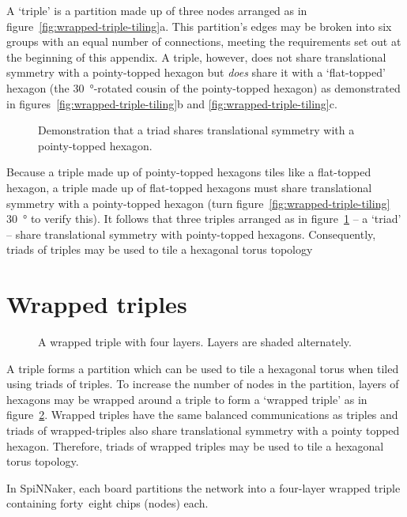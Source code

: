 		A `triple' is a partition made up of three nodes arranged as in
		figure~\ref{fig:wrapped-triple-tiling}a. This partition's edges may be
		broken into six groups with an equal number of connections, meeting the
		requirements set out at the beginning of this appendix. A triple, however,
		does not share translational symmetry with a pointy-topped hexagon but
		\emph{does} share it with a `flat-topped' hexagon (the
		\SI{30}{\degree}-rotated cousin of the pointy-topped hexagon) as
		demonstrated in figures~\ref{fig:wrapped-triple-tiling}b and
		\ref{fig:wrapped-triple-tiling}c.
		
		\begin{figure}
			\center
			
			\caption[Triads of triples tile a hexagonal torus.]%
			{Demonstration that a triad shares translational symmetry with a
			pointy-topped hexagon.}
			\label{fig:triad-tiling}
		\end{figure}
		
		Because a triple made up of pointy-topped hexagons tiles like a flat-topped
		hexagon, a triple made up of flat-topped hexagons must share translational
		symmetry with a pointy-topped hexagon (turn
		figure~\ref{fig:wrapped-triple-tiling} \SI{30}{\degree} to verify this).
		It follows that three triples arranged as in figure~\ref{fig:triad-tiling}
		-- a `triad' -- share translational symmetry with pointy-topped hexagons.
		Consequently, triads of triples may be used to tile a hexagonal torus
		topology 
	
	\section{Wrapped triples}
		
		\begin{figure}
			\center
			
			\caption[A wrapped triple with four layers.]%
			{A wrapped triple with four layers. Layers are shaded alternately.}
			\label{fig:wrapped-triple}
		\end{figure}
		
		A triple forms a partition which can be used to tile a hexagonal torus when
		tiled using triads of triples. To increase the number of nodes in the
		partition, layers of hexagons may be wrapped around a triple to form a
		`wrapped triple' as in figure~\ref{fig:wrapped-triple}. Wrapped triples
		have the same balanced communications as triples and triads of
		wrapped-triples also share translational symmetry with a pointy topped
		hexagon. Therefore, triads of wrapped triples may be used to tile a
		hexagonal torus topology.
		
		In SpiNNaker, each board partitions the network into a four-layer wrapped
		triple containing forty~eight chips (nodes) each.
